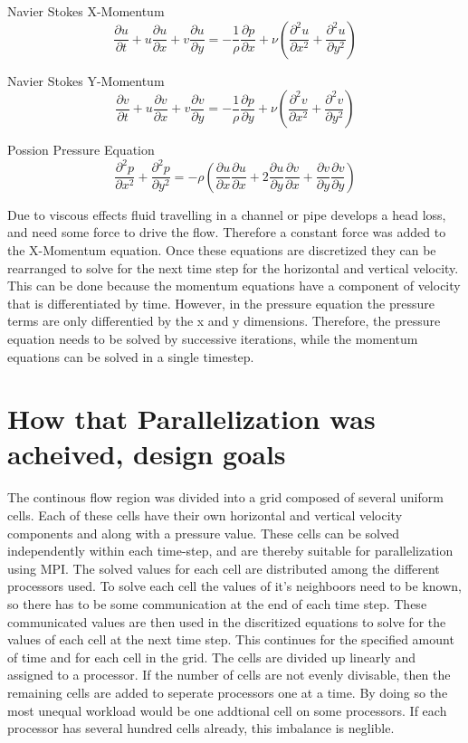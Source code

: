 \documentclass[12pt]{article}
\begin{document}
Navier Stokes X-Momentum
$$\frac{\partial u}{\partial t}+u\frac{\partial u}{\partial x}+v\frac{\partial u}{\partial y}=-\frac{1}{\rho}\frac{\partial p}{\partial x}+\nu\left(\frac{\partial^2 u}{\partial x^2}+\frac{\partial^2 u}{\partial y^2}\right)$$

Navier Stokes Y-Momentum
$$\frac{\partial v}{\partial t}+u\frac{\partial v}{\partial x}+v\frac{\partial v}{\partial y}=-\frac{1}{\rho}\frac{\partial p}{\partial y}+\nu\left(\frac{\partial^2 v}{\partial x^2}+\frac{\partial^2 v}{\partial y^2}\right)$$

Possion Pressure Equation
$$\frac{\partial^2 p}{\partial x^2}+\frac{\partial^2 p}{\partial y^2}=-\rho\left(\frac{\partial u}{\partial x}\frac{\partial u}{\partial x}+2\frac{\partial u}{\partial y}\frac{\partial v}{\partial x}+\frac{\partial v}{\partial y}\frac{\partial v}{\partial y}\right)
$$

Due to viscous effects fluid travelling in a channel or pipe develops a head loss, and need some force to drive the 
flow. Therefore a constant force was added to the X-Momentum equation. Once these equations are discretized they can 
be rearranged to solve for the next time step for the horizontal and vertical velocity. This can be done because the 
momentum equations have a component of velocity that is differentiated by time. However, in the pressure equation the 
pressure terms are only differentied by the x and y dimensions. Therefore, the pressure equation needs to be solved 
by successive iterations, while the momentum equations can be solved in a single timestep.


\section{How that Parallelization was acheived, design goals}

The continous flow region was divided into a grid composed of several uniform cells. Each of these cells have their 
own horizontal and vertical velocity components and along with a pressure value. These cells can be solved 
independently within each time-step, and are thereby suitable for parallelization using MPI. The solved values for 
each cell are distributed among the different processors used. To solve each cell the values of it's neighboors need 
to be known, so there has to be some communication at the end of each time step. These communicated values are then 
used in the discritized equations to solve for the values of each cell at the next time step. This continues for the 
specified amount of time and for each cell in the grid. The cells are divided up linearly and assigned to a processor. 
If the number of cells are not evenly divisable, then the remaining cells are added to seperate processors one at a 
time. By doing so the most unequal workload would be one addtional cell on some processors. If each processor has 
several hundred cells already, this imbalance is neglible.
\end{document}
